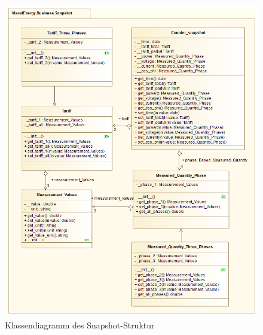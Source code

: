 \documentclass[Bachelorarbeit.tex]{subfiles}
\begin{document}
\begin{figure}
\centering
\includegraphics[width=0.9\linewidth]{./img/Klassendiagramm_Snapshot}
\caption{Klassendiagramm des Snapshot-Struktur}
\label{pic:klassendiagramm_snapshot}
\end{figure}
\newpage
\end{document}
